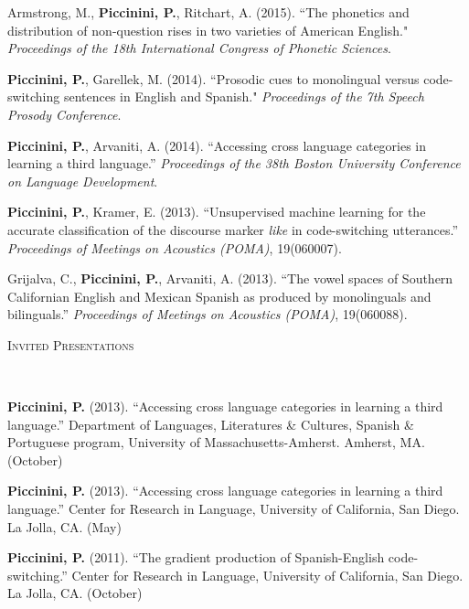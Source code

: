 \documentclass[9pt]{article}
\newenvironment{changemargin}[2]{%
  \begin{list}{}{%
    \setlength{\topsep}{0pt}%
    \setlength{\leftmargin}{#1}%
    \setlength{\rightmargin}{#2}%
    \setlength{\listparindent}{\parindent}%
    \setlength{\itemindent}{\parindent}%
    \setlength{\parsep}{\parskip}%
  }%
  \item[]}{\end{list}
}
\newcommand{\lineover}{
	\begin{changemargin}{-0.05in}{-0.05in}
		\vspace*{-8pt}
		\hrulefill \\
		\vspace*{-2pt}
	\end{changemargin}
}
\newcommand{\header}[1]{
	\begin{changemargin}{-0.5in}{-0.5in}
		\scshape{#1}\\
  	\lineover
	\end{changemargin}
}
\newenvironment{body} {
	\vspace*{-16pt}
	\begin{changemargin}{-0.25in}{-0.5in}
  }	
	{\end{changemargin}
}
\begin{document}
\begin{body}
	Armstrong, M., \textbf{Piccinini, P.}, Ritchart, A. (2015). ``The phonetics and distribution of non-question rises in two varieties of American English." \emph{Proceedings of the 18th International Congress of Phonetic Sciences}.\\
	\medskip
	
	\textbf{Piccinini, P.}, Garellek, M. (2014). ``Prosodic cues to monolingual versus code-switching sentences in English and Spanish." \emph{Proceedings of the 7th Speech Prosody Conference}.\\
	\medskip
	
	\textbf{Piccinini, P.}, Arvaniti, A. (2014). ``Accessing cross language categories in learning a third language.'' \emph{Proceedings of the 38th Boston University Conference on Language Development}.\\
	 \medskip

	\textbf{Piccinini, P.}, Kramer, E. (2013). ``Unsupervised machine learning for the accurate classification of the discourse marker \emph{like} in code-switching utterances.'' \emph{Proceedings of Meetings on Acoustics (POMA)}, 19(060007).\\
	 \medskip
	
	Grijalva, C., \textbf{Piccinini, P.}, Arvaniti, A. (2013). ``The vowel spaces of Southern Californian English and Mexican Spanish as produced by monolinguals and bilinguals.'' \emph{Proceedings of Meetings on Acoustics (POMA)}, 19(060088).\\
\end{body}

\smallskip


\header{Invited Presentations}

\begin{body}
	\vspace{14pt}

	\textbf{Piccinini, P.} (2013). ``Accessing cross language categories in learning a third language.''  Department of Languages, Literatures \& Cultures, Spanish \& Portuguese program, University of Massachusetts-Amherst. Amherst, MA. (October)\\
	\medskip
	
	\textbf{Piccinini, P.} (2013). ``Accessing cross language categories in learning a third language.''  Center for Research in Language, University of California, San Diego. La Jolla, CA. (May)\\
	\medskip
	
	\textbf{Piccinini, P.} (2011). ``The gradient  production of Spanish-English code-switching.''  Center for Research in Language, University of California, San Diego. La Jolla, CA. (October)\\
	\medskip
	
\end{body}
\end{document}
